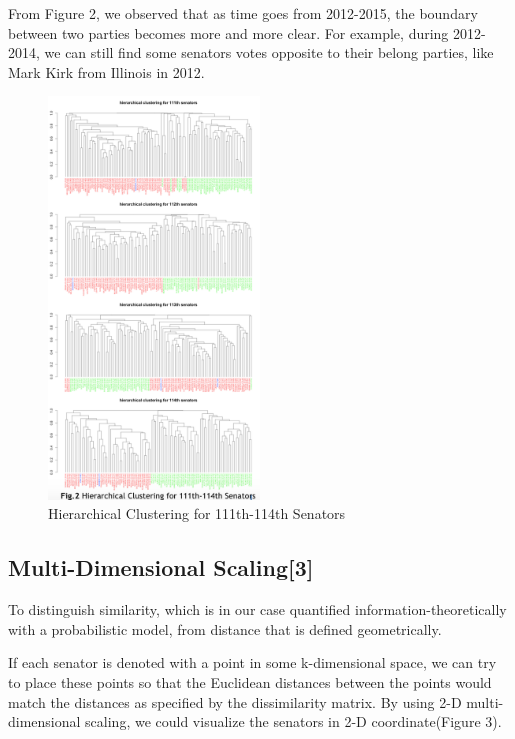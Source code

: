 \documentclass{article} %
\begin{document}
From Figure 2, we observed that as time goes from 2012-2015, the boundary between two parties becomes more and more clear. For example, during 2012-2014, we can still find some senators votes opposite to their belong parties, like Mark Kirk from Illinois in 2012.\\
\begin{figure}[h]
\begin{center}
\includegraphics[width=0.5\textwidth]{fig2}
\end{center}
\caption{Hierarchical Clustering for 111th-114th Senators}
\end{figure}
\subsection{Multi-Dimensional Scaling[3]}
To distinguish similarity, which is in our case quantified information-theoretically with a probabilistic model, from distance that is defined geometrically. 

If each senator is denoted with a point in some k-dimensional space, we can try to place these points so that the Euclidean distances between the points would match the distances as specified by the dissimilarity matrix. By using 2-D multi-dimensional scaling, we could visualize the senators in 2-D coordinate(Figure 3).
\end{document}
